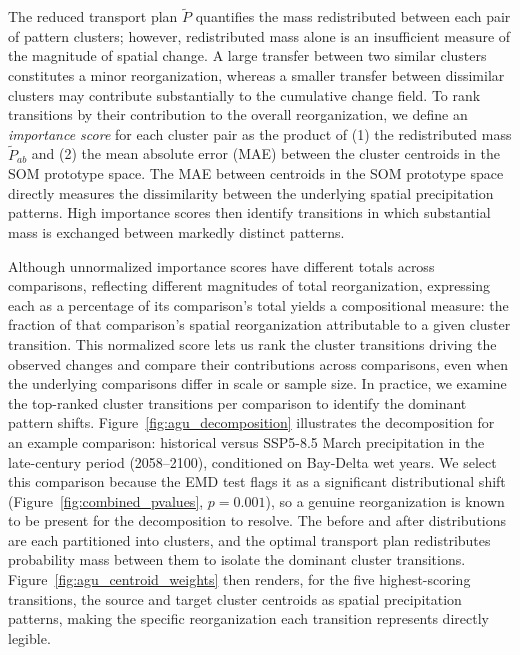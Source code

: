 The reduced transport plan $\tilde{P}$ quantifies the mass redistributed between each pair of pattern clusters; however, redistributed mass alone is an insufficient measure of the magnitude of spatial change.
%
A large transfer between two similar clusters constitutes a minor reorganization, whereas a smaller transfer between dissimilar clusters may contribute substantially to the cumulative change field.
%
To rank transitions by their contribution to the overall reorganization, we define an \textit{importance score} for each cluster pair as the product of (1) the redistributed mass $\tilde{P}_{ab}$ and (2) the mean absolute error (MAE) between the cluster centroids in the SOM prototype space.
%
The MAE between centroids in the SOM prototype space directly measures the dissimilarity between the underlying spatial precipitation patterns. High importance scores then identify transitions in which substantial mass is exchanged between markedly distinct patterns.

Although unnormalized importance scores have different totals across comparisons, reflecting different magnitudes of total reorganization, expressing each as a percentage of its comparison's total yields a compositional measure: the fraction of that comparison's spatial reorganization attributable to a given cluster transition.
%
This normalized score lets us rank the cluster transitions driving the observed changes and compare their contributions across comparisons, even when the underlying comparisons differ in scale or sample size. In practice, we examine the top-ranked cluster transitions per comparison to identify the dominant pattern shifts.
%
Figure~\ref{fig:agu_decomposition} illustrates the decomposition for an example comparison: historical versus SSP5-8.5 March precipitation in the late-century period (2058--2100), conditioned on Bay-Delta wet years.
%
We select this comparison because the EMD test flags it as a significant distributional shift (Figure~\ref{fig:combined_pvalues}, $p = 0.001$), so a genuine reorganization is known to be present for the decomposition to resolve.
%
The before and after distributions are each partitioned into clusters, and the optimal transport plan redistributes probability mass between them to isolate the dominant cluster transitions.
%
Figure~\ref{fig:agu_centroid_weights} then renders, for the five highest-scoring transitions, the source and target cluster centroids as spatial precipitation patterns, making the specific reorganization each transition represents directly legible.


